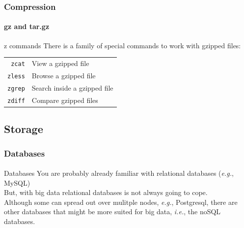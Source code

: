 \documentclass[aspectratio=169,dvipsnames]{beamer}
\begin{document}
    \begin{frame}
        \frametitle{Compression}
        \framesubtitle{gz and tar.gz}
        \begin{block}{z commands}
            There is a family of special commands to work with gzipped files:
            
            \begin{center}
            \begin{tabular}{rl}
                \texttt{zcat} & View a gzipped file \\
                \texttt{zless} & Browse a gzipped file \\
                \texttt{zgrep} & Search inside a gzipped file \\
                \texttt{zdiff} & Compare gzipped files \\
            \end{tabular}
            \end{center}
        \end{block}
    \end{frame}

\subsection{Storage}
    \begin{frame}
        \frametitle{Databases}
        \framesubtitle{}

        \begin{block}{Databases}
        \small
            You are probably already familiar with \alert{relational databases} (\textit{e.g.}, MySQL) \\[10pt]

            But, with big data \alert{relational databases is not always going to cope}.\\[10pt]


            Although some can spread out over mulitple nodes, \textit{e.g.},
            Postgresql, there are other databases that might be more suited for
            big data, \textit{i.e.}, the \alert{noSQL databases}.
        \end{block}
    \end{frame}
    
\end{document}

